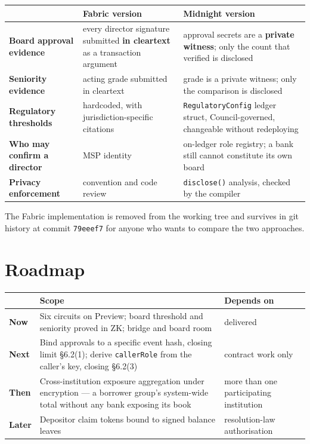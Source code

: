 \documentclass[11pt,a4paper]{article}
\begin{document}
\begin{tabularx}{\textwidth}{@{}L{0.24}L{0.38}L{0.38}@{}}
\toprule
 & \textbf{Fabric version} & \textbf{Midnight version} \\
\midrule
\textbf{Board approval evidence} & every director signature submitted \textbf{in cleartext} as a
transaction argument & approval secrets are a \textbf{private witness}; only the count that verified is
disclosed \\
\textbf{Seniority evidence} & acting grade submitted in cleartext & grade is a private witness; only the
comparison is disclosed \\
\textbf{Regulatory thresholds} & hardcoded, with jurisdiction-specific citations &
\texttt{RegulatoryConfig} ledger struct, Council-governed, changeable without redeploying \\
\textbf{Who may confirm a director} & MSP identity & on-ledger role registry; a bank still cannot
constitute its own board \\
\textbf{Privacy enforcement} & convention and code review & \texttt{disclose()} analysis, checked by the
compiler \\
\bottomrule
\end{tabularx}

\vspace{4pt}
The Fabric implementation is removed from the working tree and survives in git history at commit
\texttt{79eeef7} for anyone who wants to compare the two approaches.

\section{Roadmap}

\begin{tabularx}{\textwidth}{@{}L{0.14}L{0.56}L{0.30}@{}}
\toprule
 & \textbf{Scope} & \textbf{Depends on} \\
\midrule
\textbf{Now} & Six circuits on Preview; board threshold and seniority proved in ZK; bridge and board room
& delivered \\
\textbf{Next} & Bind approvals to a specific event hash, closing limit \S6.2(1); derive
\texttt{callerRole} from the caller's key, closing \S6.2(3) & contract work only \\
\textbf{Then} & Cross-institution exposure aggregation under encryption --- a borrower group's system-wide
total without any bank exposing its book & more than one participating institution \\
\textbf{Later} & Depositor claim tokens bound to signed balance leaves & resolution-law authorisation \\
\bottomrule
\end{tabularx}
\end{document}
